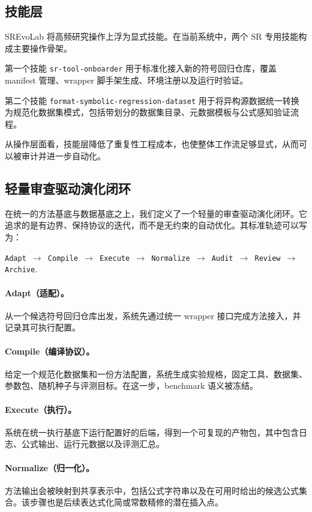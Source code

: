 \documentclass[UTF8]{ctexart}
\begin{document}
\subsection{技能层}

SREvoLab 将高频研究操作上浮为显式技能。在当前系统中，两个 SR 专用技能构成主要操作骨架。

第一个技能 \texttt{sr-tool-onboarder} 用于标准化接入新的符号回归仓库，覆盖 manifest 管理、wrapper 脚手架生成、环境注册以及运行时验证。

第二个技能 \texttt{format-symbolic-regression-dataset} 用于将异构源数据统一转换为规范化数据集模式，包括带划分的数据集目录、元数据模板与公式感知验证流程。

从操作层面看，技能层降低了重复性工程成本，也使整体工作流足够显式，从而可以被审计并进一步自动化。

\subsection{轻量审查驱动演化闭环}

在统一的方法基底与数据基底之上，我们定义了一个轻量的审查驱动演化闭环。它追求的是有边界、保持协议的迭代，而不是无约束的自动优化。其标准轨迹可以写为：
\begin{center}
\texttt{Adapt $\rightarrow$ Compile $\rightarrow$ Execute $\rightarrow$ Normalize $\rightarrow$ Audit $\rightarrow$ Review $\rightarrow$ Archive}.
\end{center}

\paragraph{Adapt（适配）。}
从一个候选符号回归仓库出发，系统先通过统一 wrapper 接口完成方法接入，并记录其可执行配置。

\paragraph{Compile（编译协议）。}
给定一个规范化数据集和一份方法配置，系统生成实验规格，固定工具、数据集、参数包、随机种子与评测目标。在这一步，benchmark 语义被冻结。

\paragraph{Execute（执行）。}
系统在统一执行基底下运行配置好的后端，得到一个可复现的产物包，其中包含日志、公式输出、运行元数据以及评测汇总。

\paragraph{Normalize（归一化）。}
方法输出会被映射到共享表示中，包括公式字符串以及在可用时给出的候选公式集合。该步骤也是后续表达式化简或常数精修的潜在插入点。
\end{document}

